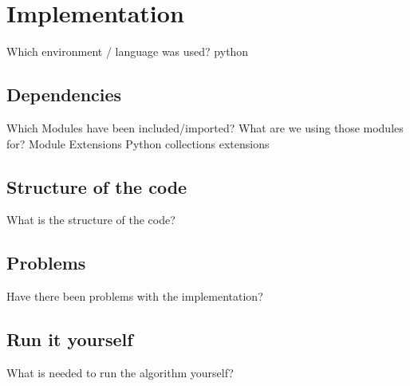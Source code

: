 \chapter{Implementation}
  Which environment / language was used?\newline
  python\newline
\section{Dependencies}
  Which Modules have been included/imported?\newline
  What are we using those modules for?\newline
  Module Extensions\newline
    Python collections extensions\newline
\section{Structure of the code}
  What is the structure of the code?\newline
\section{Problems}
  Have there been problems with the implementation?\newline
\section{Run it yourself}
  What is needed to run the algorithm yourself?\newline

